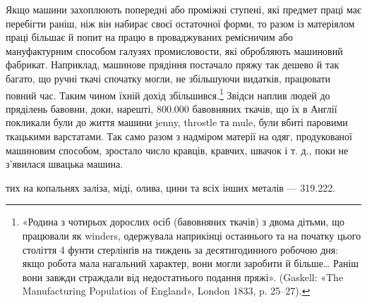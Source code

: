 Якщо машини захоплюють попередні або проміжні ступені,
які предмет праці має перебігти раніш, ніж він набирає своєї
остаточної форми, то разом із матеріялом праці більшає й попит
на працю в проваджуваних ремісничим або мануфактурним способом
галузях промисловости, які обробляють машиновий
фабрикат. Наприклад, машинове прядіння постачало пряжу так
дешево й так багато, що ручні ткачі спочатку могли, не збільшуючи
видатків, працювати повний час. Таким чином їхній дохід
збільшився.\footnote{
«Родина з чотирьох дорослих осіб (бавовняних ткачів) з двома
дітьми, що працювали як winders, одержувала наприкінці останнього та
на початку цього століття 4 фунти стерлінґів на тиждень за десятигодинного
робочою дня: якщо робота мала нагальний характер, вони могли
заробити й більше\dots{} Раніш вони завжди страждали від недостатнього
подання пряжі». (Gaskell: «The Manufacturing Population of England»,
London 1833, p. 25--27).
} Звідси наплив людей до пряділень бавовни,
доки, нарешті, 800.000 бавовняних ткачів, що їх в Англії покликали
були до життя машини jenny, throstle та mule, були
вбиті паровими ткацькими варстатами. Так само разом з надміром
матерії на одяг, продукованої машиновим способом, зростало
число кравців, кравчих, швачок і т. д., поки не з’явилася
швацька машина.

тих на копальнях заліза, міді, олива, цини та всіх інших металів —
319.222.
